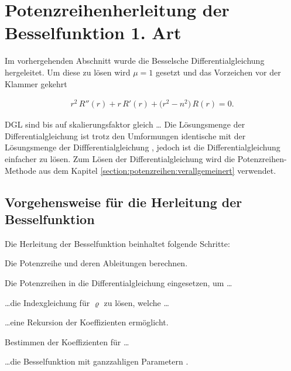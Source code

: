 \section[Potenzreihenherleitung der Besselfunktion]{Potenzreihenherleitung der Besselfunktion 1. Art}
\begin{normalsize}
Im vorhergehenden Abschnitt wurde die Besselsche Differentialgleichung  hergeleitet.
Um diese zu l\"osen wird $\mu = 1$ gesetzt und das Vorzeichen vor der Klammer gekehrt
\end{normalsize}
\begin{align}
	r^2 \, R'' \left( r \right)
	+
	r \, R' \left( r \right)
	+
	\big( r^2 - n^2 \big) \, R \left( r \right)
	=
	0
	\label{eq:bessel:dgl}
	\text{.}
\end{align}
\begin{normalsize}%
DGL sind bis auf skalierungsfaktor gleich \dots
Die L\"osungsmenge der Differentialgleichung  ist trotz den Umformungen identische mit der L\"osungsmenge der Diffferentialgleichung , jedoch ist die Differentialgleichung  einfacher zu l\"osen.
Zum L\"osen der Differentialgleichung  wird die Potenzreihen-Methode aus dem Kapitel \ref{section:potenzreihen:verallgemeinert} verwendet.
\end{normalsize}
\subsection{Vorgehensweise f\"ur die Herleitung der Besselfunktion}
\begin{normalsize}%
Die Herleitung der Besselfunktion beinhaltet folgende Schritte:
\end{normalsize}
\begin{compactenum}
	\item Die Potenzreihe und deren Ableitungen berechnen.
	\item Die Potenzreihen in die Differentialgleichung  eingesetzen, um \dots
	\item \dots die Indexgleichung f\"ur $\varrho$ zu l\"osen, welche \dots
	\item \dots eine Rekursion der Koeffizienten erm\"oglicht.
	\item Bestimmen der Koeffizienten f\"ur \dots
	\item \dots die Besselfunktion mit ganzzahligen Parametern .
\end{compactenum}
\setcounter{stepCounter}{1}
